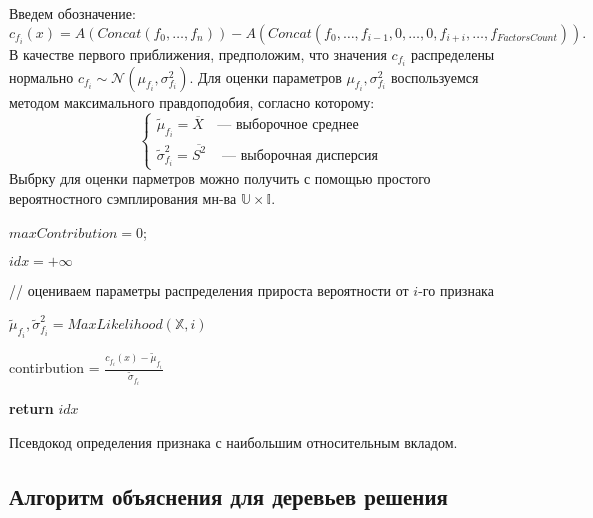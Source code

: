 \documentclass[12pt,a4paper]{report}
\begin{document}
Введем обозначение: 
\begin{equation*}
c_{f_i}(x) = A(Concat(f_0, \dots, f_n)) - A(Concat(f_0, \dots, f_{i-1}, 0, \dots, 0, f_{i+i}, \dots, f_{FactorsCount})).
\end{equation*}
В качестве первого приближения, предположим, что значения $c_{f_i}$ распределены нормально $c_{f_i}\sim\mathcal{N}(\mu_{f_i}, \sigma_{f_i}^2)$.
Для оценки параметров $\mu_{f_i}, \sigma_{f_i}^2$ воспользуемся методом максимального правдоподобия, согласно которому:
\begin{equation*}
\begin{cases}
\tilde{\mu}_{f_i} = \overline{X} &\text{--- выборочное среднее} 
\\ \tilde{\sigma}_{f_i}^2 = \overline{S^2} &\text{ --- выборочная дисперсия}
\end{cases}
\end{equation*}
Выбрку для оценки парметров можно получить с помощью простого вероятностного сэмплирования мн-ва $\mathbb{U} \times \mathbb{I}$.


\begin{algorithm}[H]
\SetAlgoLined
{}

$maxContribution = 0$;

$idx = +\infty$

 {

// оцениваем параметры распределения прироста вероятности от $i$-го признака

$\tilde{\mu}_{f_i}, \tilde{\sigma}_{f_i}^2 = MaxLikelihood(\mathbb{X}, i)$

contirbution = $\frac{c_{f_i}(x) - \tilde{\mu}_{f_i}}{\tilde{\sigma}_{f_i}}$

}

\textbf{return} $idx$
\caption{Псевдокод определения признака с наибольшим относительным вкладом.}
\label{alg:normalAI}
\end{algorithm}

\subsection{Алгоритм объяснения для деревьев решения}
\end{document}
